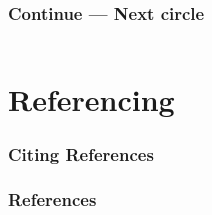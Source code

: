 \documentclass[
  11pt, %
  xcolor=dvipsnames
]{beamer}
\begin{document}
\subsubsection{Continue --- Next circle}
\begin{frame}[fragile]

	\begin{columns}[c]
		\begin{column}{0.9\textwidth}


		\end{column}
	\end{columns}

\end{frame}























\section{Referencing}

\begin{frame}
	\frametitle{Citing References}

	\bigskip %

\end{frame}


\begin{frame} %
	\frametitle{References}

	\begin{thebibliography}{99} %
		\footnotesize %

	\end{thebibliography}
\end{frame}
\end{document}
